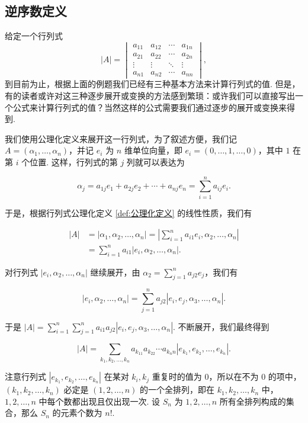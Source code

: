\subsection{逆序数定义}

给定一个行列式
\[|A| = \begin{vmatrix}
        a_{11} & a_{12} & \cdots & a_{1n} \\
        a_{21} & a_{22} & \cdots & a_{2n} \\
        \vdots & \vdots & \ddots & \vdots \\
        a_{n1} & a_{n2} & \cdots & a_{nn}
    \end{vmatrix},\]
到目前为止，根据上面的例题我们已经有三种基本方法来计算行列式的值. 但是，有的读者或许对这三种逐步展开或变换的方法感到繁琐：或许我们可以直接写出一个公式来计算行列式的值？当然这样的公式需要我们通过逐步的展开或变换来得到.

我们使用公理化定义来展开这一行列式，为了叙述方便，我们记 $A = (\alpha_1,\ldots,\alpha_n)$，并记 $e_i$ 为 $n$ 维单位向量，即 $e_i = (0,\ldots,1,\ldots,0)$，其中 $1$ 在第 $i$ 个位置. 这样，行列式的第 $j$ 列就可以表达为

\[\alpha_j = a_{1j}e_1 + a_{2j}e_2 + \cdots + a_{nj}e_n = \sum_{i=1}^{n}a_{ij}e_i.\]

于是，根据行列式公理化定义 \autoref{def:公理化定义} 的线性性质，我们有

\begin{align*}
    |A| & = |\alpha_1,\alpha_2,\ldots,\alpha_n| = |\sum\limits_{i=1}^{n}a_{i1}e_i,\alpha_2,\ldots,\alpha_n| \\
        & = \sum\limits_{i=1}^{n}a_{i1}|e_i,\alpha_2,\ldots,\alpha_n|.
\end{align*}

对行列式 $|e_i,\alpha_2,\ldots,\alpha_n|$ 继续展开，由 $\alpha_2 = \sum\limits_{j=1}^{n}a_{j2}e_j$，我们有

\[|e_i,\alpha_2,\ldots,\alpha_n| = \sum\limits_{j=1}^{n}a_{j2}|e_i,e_j,\alpha_3,\ldots,\alpha_n|.\]

于是 $|A| = \sum\limits_{i=1}^{n}\sum\limits_{j=1}^{n}a_{i1}a_{j2}|e_i,e_j,\alpha_3,\ldots,\alpha_n|$. 不断展开，我们最终得到

\[|A| = \sum\limits_{k_1,k_2,\ldots,k_n} a_{k_11}a_{k_22}\cdots a_{k_nn}|e_{k_1},e_{k_2},\ldots,e_{k_n}|.\]

注意行列式 $|e_{k_1},e_{k_2},\ldots,e_{k_n}|$ 在某对 $k_i,k_j$ 重复时的值为 $0$，所以在不为 $0$ 的项中，$(k_1,k_2,\ldots,k_n)$ 必定是 $(1,2,\ldots,n)$ 的一个全排列，即在 $k_1,k_2,\ldots,k_n$ 中，$1,2,\ldots,n$ 中每个数都出现且仅出现一次. 设 $S_n$ 为 $1,2,\ldots,n$ 所有全排列构成的集合，那么 $S_n$ 的元素个数为 $n!$.

